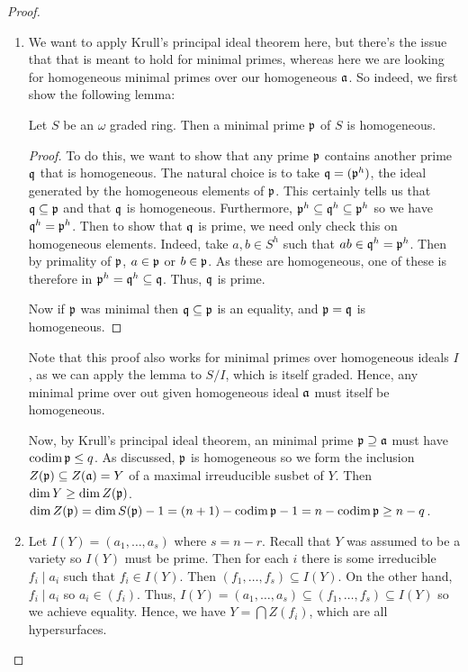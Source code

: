\begin{proof}
    \begin{enumerate}[label = (\alph*)]
        \item We want to apply Krull's principal ideal theorem here, but there's the issue that that is meant to hold for minimal primes, whereas here we are looking for homogeneous minimal primes over our homogeneous $\mathfrak a$. So indeed, we first show the following lemma:
        \begin{lemma}
            Let $S$ be an $\omega$ graded ring. Then a minimal prime $\mathfrak p$ of $S$ is homogeneous.
        \end{lemma}
        \begin{proof}
            To do this, we want to show that any prime $\mathfrak p$ contains another prime $\mathfrak q$ that is homogeneous. The natural choice is to take $\mathfrak q = (\mathfrak p^h)$, the ideal generated by the homogeneous elements of $\mathfrak p$. This certainly tells us that $\mathfrak q \subseteq \mathfrak p$ and that $\mathfrak q$ is homogeneous. Furthermore, $\mathfrak p^h \subseteq \mathfrak q^h \subseteq \mathfrak p^h$ so we have $\mathfrak q^h = \mathfrak p^h$. Then to show that $\mathfrak q$ is prime, we need only check this on homogeneous elements. Indeed, take $a, b \in S^h$ such that $ab \in \mathfrak q^h = \mathfrak p^h$. Then by primality of $\mathfrak p$, $a \in \mathfrak p$ or $b \in \mathfrak p$. As these are homogeneous, one of these is therefore in $\mathfrak p^h = \mathfrak q^h \subseteq \mathfrak q$. Thus, $\mathfrak q$ is prime.

            Now if $\mathfrak p$ was minimal then $\mathfrak q \subseteq \mathfrak p$ is an equality, and $\mathfrak p = \mathfrak q$ is homogeneous.
        \end{proof}
        Note that this proof also works for minimal primes over homogeneous ideals $I$, as we can apply the lemma to $S/I$, which is itself graded. Hence, any minimal prime over out given homogeneous ideal $\mathfrak a$ must itself be homogeneous.

        Now, by Krull's principal ideal theorem, an minimal prime $\mathfrak p \supseteq \mathfrak a$ must have $\operatorname{codim} \mathfrak p \leq q$. As discussed, $\mathfrak p$ is homogeneous so we form the inclusion $Z(\mathfrak p) \subseteq Z(\mathfrak a) = Y$ of a maximal irreuducible susbet of $Y$. Then $\dim Y \geq \dim Z(\mathfrak p)$. $\dim Z(\mathfrak p) = \dim S(\mathfrak p) - 1 = (n + 1) - \operatorname{codim} \mathfrak p - 1 = n - \operatorname{codim} \mathfrak p \geq n - q$.

        \item Let $I(Y) = (a_1, \dots, a_s)$ where $s = n - r$. Recall that $Y$ was assumed to be a variety so $I(Y)$ must be prime. Then for each $i$ there is some irreducible $f_i \mid a_i$ such that $f_i \in I(Y)$. Then $(f_1, \dots, f_s) \subseteq I(Y)$. On the other hand, $f_i \mid a_i$ so $a_i \in (f_i)$. Thus, $I(Y) = (a_1, \dots, a_s) \subseteq (f_1, \dots, f_s) \subseteq I(Y)$ so we achieve equality. Hence, we have $Y = \bigcap Z(f_i)$, which are all hypersurfaces.
        

\end{enumerate}
\end{proof}

